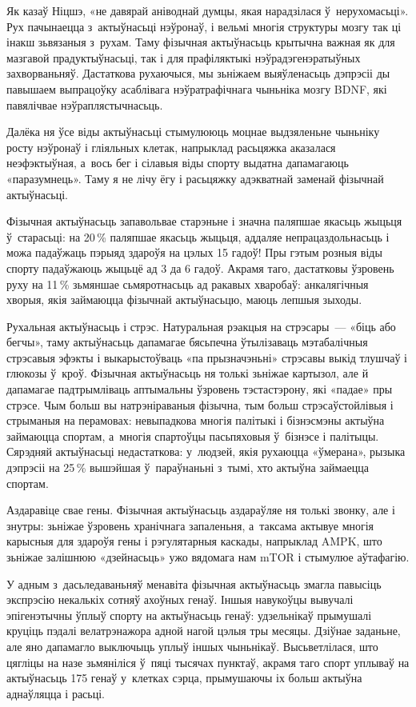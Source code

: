 Як казаў Ніцшэ, «не давярай аніводнай думцы, якая нарадзілася ў~нерухомасьці». Рух пачынаецца з~актыўнасьці нэўронаў, і вельмі многія структуры мозгу так ці інакш зьвязаныя з~рухам. Таму фізычная актыўнасьць крытычна важная як для мазгавой прадуктыўнасьці, так і для прафіляктыкі нэўрадэгенэратыўных захворваньняў. Дастаткова рухаючыся, мы зьніжаем выяўленасьць дэпрэсіі ды павышаем выпрацоўку асаблівага нэўратрафічнага чыньніка мозгу BDNF, які павялічвае нэўраплястычнасьць.

Далёка ня ўсе віды актыўнасьці стымулююць моцнае выдзяленьне чыньніку росту нэўронаў і гліяльных клетак, напрыклад расьцяжка аказалася неэфэктыўная, а~вось бег і сілавыя віды спорту выдатна дапамагаюць «паразумнець». Таму я не лічу ёгу і расьцяжку адэкватнай заменай фізычнай актыўнасьці.

Фізычная актыўнасьць запавольвае старэньне і значна паляпшае якасьць жыцьця ў~старасьці: на 20\,\% паляпшае якасьць жыцьця, аддаляе непрацаздольнасьць і можа падаўжаць пэрыяд здароўя на цэлых 15 гадоў! Пры гэтым розныя віды спорту падаўжаюць жыцьцё ад 3 да 6 гадоў. Акрамя таго, дастатковы ўзровень руху на 11\,\% зьмяншае сьмяротнасьць ад ракавых хваробаў: анкалягічныя хворыя, якія займаюцца фізычнай актыўнасьцю, маюць лепшыя зыходы.

Рухальная актыўнасьць і стрэс. Натуральная рэакцыя на стрэсары~--- «біць або бегчы», таму актыўнасьць дапамагае бясьпечна ўтылізаваць мэтабалічныя стрэсавыя эфэкты і выкарыстоўваць «па прызначэньні» стрэсавы выкід тлушчаў і глюкозы ў~кроў. Фізычная актыўнасьць ня толькі зьніжае картызол, але й дапамагае падтрымліваць аптымальны ўзровень тэстастэрону, які «падае» пры стрэсе. Чым больш вы натрэніраваныя фізычна, тым больш стрэсаўстойлівыя і стрыманыя на перамовах: невыпадкова многія палітыкі і бізнэсмэны актыўна займаюцца спортам, а~многія спартоўцы пасьпяховыя ў~бізнэсе і палітыцы. Сярэдняй актыўнасьці недастаткова: у~людзей, якія рухаюцца «ўмерана», рызыка дэпрэсіі на 25\,\% вышэйшая ў~параўнаньні з~тымі, хто актыўна займаецца спортам.

Аздаравіце свае гены. Фізычная актыўнасьць аздараўляе ня толькі звонку, але і знутры: зьніжае ўзровень хранічнага запаленьня, а~таксама актывуе многія карысныя для здароўя гены і рэгулятарныя каскады, напрыклад AMPK, што зьніжае залішнюю «дзейнасьць» ужо вядомага нам mTOR і стымулюе аўтафагію.

У адным з~дасьледаваньняў менавіта фізычная актыўнасьць змагла павысіць экспрэсію некалькіх сотняў ахоўных генаў. Іншыя навукоўцы вывучалі эпігенэтычны ўплыў спорту на актыўнасьць генаў: удзельнікаў прымушалі круціць пэдалі велатрэнажора адной нагой цэлыя тры месяцы. Дзіўнае заданьне, але яно дапамагло выключыць уплыў іншых чыньнікаў. Высьветлілася, што цягліцы на назе зьмяніліся ў~пяці тысячах пунктаў, акрамя таго спорт уплываў на актыўнасьць 175 генаў у~клетках сэрца, прымушаючы іх больш актыўна аднаўляцца і расьці.

